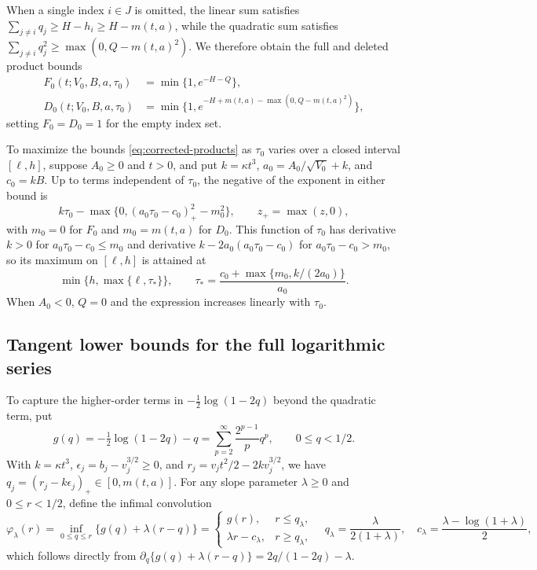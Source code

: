 \documentclass[11pt]{article}
\numberwithin{equation}{section}
\theoremstyle{remark}
\begin{document}
When a single index $i\in J$ is omitted, the linear sum satisfies
$\sum_{j\ne i}q_j\ge H-h_i\ge H-m(t,a)$, while the quadratic sum satisfies
$\sum_{j\ne i}q_j^2\ge\max(0,Q-m(t,a)^2)$. We therefore obtain the full and
deleted product bounds
\begin{equation}\label{eq:corrected-products}
 \begin{split}
 F_0(t;V_0,B,a,\tau_0)&=\min\{1,e^{-H-Q}\},\\
 D_0(t;V_0,B,a,\tau_0)&=\min\{1,e^{-H+m(t,a)-\max(0,Q-m(t,a)^2)}\},
 \end{split}
\end{equation}
setting $F_0=D_0=1$ for the empty index set.

To maximize the bounds \eqref{eq:corrected-products} as $\tau_0$ varies over
a closed interval $[\ell,h]$, suppose $A_0\ge0$ and $t>0$, and put
$k=\kappa t^3$, $a_0=A_0/\sqrt{V_0}+k$, and $c_0=kB$. Up to terms
independent of $\tau_0$, the negative of the exponent in either bound is
\[
 k\tau_0-\max\{0,(a_0\tau_0-c_0)_+^2-m_0^2\},
 \qquad z_+=\max(z,0),
\]
with $m_0=0$ for $F_0$ and $m_0=m(t,a)$ for $D_0$. This function of $\tau_0$
has derivative $k>0$ for $a_0\tau_0-c_0\le m_0$ and derivative
$k-2a_0(a_0\tau_0-c_0)$ for $a_0\tau_0-c_0>m_0$, so its maximum on
$[\ell,h]$ is attained at
\[
 \min\{h,\max\{\ell,\tau_*\}\},\qquad
 \tau_*=\frac{c_0+\max\{m_0,k/(2a_0)\}}{a_0}.
\]
When $A_0<0$, $Q=0$ and the expression increases linearly with $\tau_0$.

\subsection{Tangent lower bounds for the full logarithmic series}\label{sec:current-log}

To capture the higher-order terms in $-\tfrac12\log(1-2q)$ beyond the
quadratic term, put
\[
 g(q)=-\tfrac12\log(1-2q)-q=\sum_{p=2}^\infty\frac{2^{p-1}}p q^p,\qquad 0\le q<1/2.
\]
With $k=\kappa t^3$, $\epsilon_j=b_j-v_j^{3/2}\ge0$, and
$r_j=v_jt^2/2-2kv_j^{3/2}$, we have $q_j=(r_j-k\epsilon_j)_+\in[0,m(t,a)]$.
For any slope parameter $\lambda\ge0$ and $0\le r<1/2$, define the infimal
convolution
\begin{equation}\label{eq:current-infimum}
 \varphi_\lambda(r)=\inf_{0\le q\le r}
       \{g(q)+\lambda(r-q)\}
 =\begin{cases}
   g(r),&r\le q_\lambda,\\
   \lambda r-c_\lambda,&r\ge q_\lambda,
  \end{cases}
 \quad
 q_\lambda=\frac{\lambda}{2(1+\lambda)},\quad
 c_\lambda=\frac{\lambda-\log(1+\lambda)}2,
\end{equation}
which follows directly from $\partial_q\{g(q)+\lambda(r-q)\}=2q/(1-2q)-\lambda$.
\end{document}
